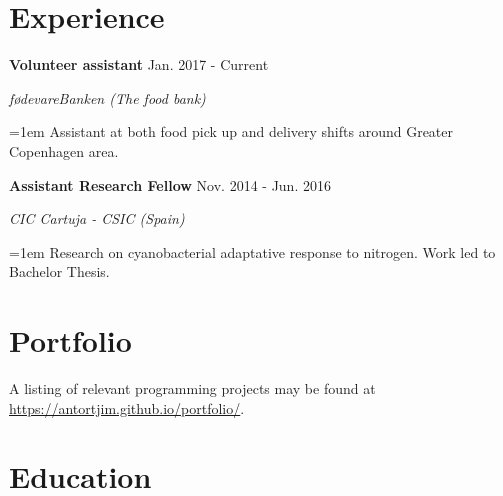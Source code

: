 \documentclass[paper=a4,fontsize=11pt]{article}
\newcommand{\NewPart}[1]{\section*{
{#1}}}
\newcommand{\Entry}[4]{
		\noindent \textbf{#1} \hfill      %
		\textsf{#2} \par                  %
		\noindent \textit{#3} \par        %
		  \noindent\hangindent=1em\hangafter=0 \small #4  %
		\normalsize \par \vspace{7.5pt}}
\begin{document}
\NewPart{Experience}{}

\Entry{Volunteer assistant}{Jan. 2017 - Current}{f{\o}devareBanken (The food bank)}{Assistant at both food pick up and delivery shifts around Greater Copenhagen area.}

\Entry{Assistant Research Fellow}{Nov. 2014 - Jun. 2016}{CIC Cartuja - CSIC (Spain)}{Research on cyanobacterial adaptative response to nitrogen. Work led to Bachelor Thesis.}

\NewPart{Portfolio}

A listing of relevant programming projects may be found at \href{https://antortjim.github.io/portfolio/}{https://antortjim.github.io/portfolio/}.


\newcommand{\kulogo}{ \hspace{5pt} \texttt{[image: images/ku\_logo.png]}}
\newcommand{\uslogo}{ \hspace{5pt} \texttt{[image: images/us\_logo.png]}}
\newcommand{\msctitle}{%
                       \textbf{MSc.} %
                       \textbf{Bioinformatics}
                       }


\newcommand{\bsctitle}{\textbf{BSc. Biochemistry}}
\newcommand{\bscyears}{\begin{math}\boldsymbol{2012-2016}\end{math}}
\newcommand{\mscyears}{\begin{math}\boldsymbol{2016-2018}\end{math}}		
\NewPart{Education}{}
\end{document}
